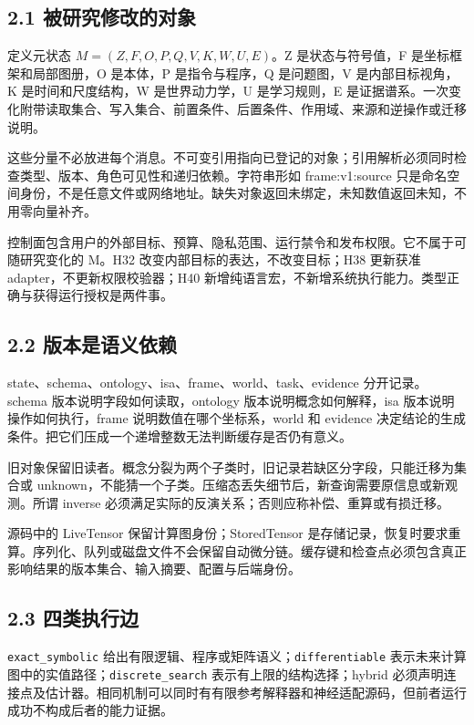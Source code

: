 \documentclass[
  10pt,
]{article}
\begin{document}
\subsection{2.1
被研究修改的对象}\label{ux88abux7814ux7a76ux4feeux6539ux7684ux5bf9ux8c61}

定义元状态 \(M=(Z,F,O,P,Q,V,K,W,U,E)\)。Z 是状态与符号值，F
是坐标框架和局部图册，O 是本体，P 是指令与程序，Q 是问题图，V
是内部目标视角，K 是时间和尺度结构，W 是世界动力学，U 是学习规则，E
是证据谱系。一次变化附带读取集合、写入集合、前置条件、后置条件、作用域、来源和逆操作或迁移说明。

这些分量不必放进每个消息。不可变引用指向已登记的对象；引用解析必须同时检查类型、版本、角色可见性和递归依赖。字符串形如
frame:v1:source
只是命名空间身份，不是任意文件或网络地址。缺失对象返回未绑定，未知数值返回未知，不用零向量补齐。

控制面包含用户的外部目标、预算、隐私范围、运行禁令和发布权限。它不属于可随研究变化的
M。H32 改变内部目标的表达，不改变目标；H38 更新获准
adapter，不更新权限校验器；H40
新增纯语言宏，不新增系统执行能力。类型正确与获得运行授权是两件事。

\subsection{2.2
版本是语义依赖}\label{ux7248ux672cux662fux8bedux4e49ux4f9dux8d56}

state、schema、ontology、isa、frame、world、task、evidence
分开记录。schema 版本说明字段如何读取，ontology
版本说明概念如何解释，isa 版本说明操作如何执行，frame
说明数值在哪个坐标系，world 和 evidence
决定结论的生成条件。把它们压成一个递增整数无法判断缓存是否仍有意义。

旧对象保留旧读者。概念分裂为两个子类时，旧记录若缺区分字段，只能迁移为集合或
unknown，不能猜一个子类。压缩态丢失细节后，新查询需要原信息或新观测。所谓
inverse 必须满足实际的反演关系；否则应称补偿、重算或有损迁移。

源码中的 LiveTensor 保留计算图身份；StoredTensor
是存储记录，恢复时要求重算。序列化、队列或磁盘文件不会保留自动微分链。缓存键和检查点必须包含真正影响结果的版本集合、输入摘要、配置与后端身份。

\subsection{2.3 四类执行边}\label{ux56dbux7c7bux6267ux884cux8fb9}

\nolinkurl{exact_symbolic}
给出有限逻辑、程序或矩阵语义；\nolinkurl{differentiable}
表示未来计算图中的实值路径；\nolinkurl{discrete_search}
表示有上限的结构选择；hybrid
必须声明连接点及估计器。相同机制可以同时有有限参考解释器和神经适配源码，但前者运行成功不构成后者的能力证据。
\end{document}
